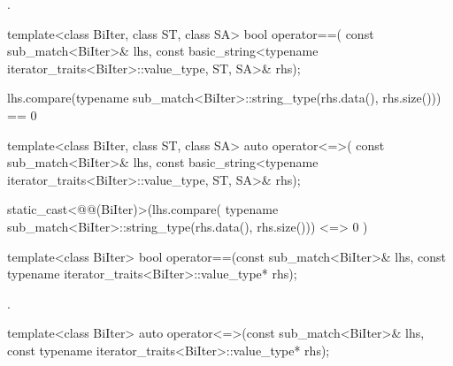 \begin{itemdescr}
\pnum
\returns
{}.
\end{itemdescr}

%
\begin{itemdecl}
template<class BiIter, class ST, class SA>
  bool operator==(
      const sub_match<BiIter>& lhs,
      const basic_string<typename iterator_traits<BiIter>::value_type, ST, SA>& rhs);
\end{itemdecl}

\begin{itemdescr}
\pnum
\returns
\begin{codeblock}
lhs.compare(typename sub_match<BiIter>::string_type(rhs.data(), rhs.size())) == 0
\end{codeblock}
\end{itemdescr}

%
\begin{itemdecl}
template<class BiIter, class ST, class SA>
  auto operator<=>(
      const sub_match<BiIter>& lhs,
      const basic_string<typename iterator_traits<BiIter>::value_type, ST, SA>& rhs);
\end{itemdecl}

\begin{itemdescr}
\pnum
\returns
\begin{codeblock}
static_cast<@@(BiIter)>(lhs.compare(
    typename sub_match<BiIter>::string_type(rhs.data(), rhs.size()))
      <=> 0
    )
\end{codeblock}
\end{itemdescr}

%
\begin{itemdecl}
template<class BiIter>
  bool operator==(const sub_match<BiIter>& lhs,
                  const typename iterator_traits<BiIter>::value_type* rhs);
\end{itemdecl}

\begin{itemdescr}
\pnum
\returns
{}.
\end{itemdescr}

%
\begin{itemdecl}
template<class BiIter>
  auto operator<=>(const sub_match<BiIter>& lhs,
                   const typename iterator_traits<BiIter>::value_type* rhs);
\end{itemdecl}

